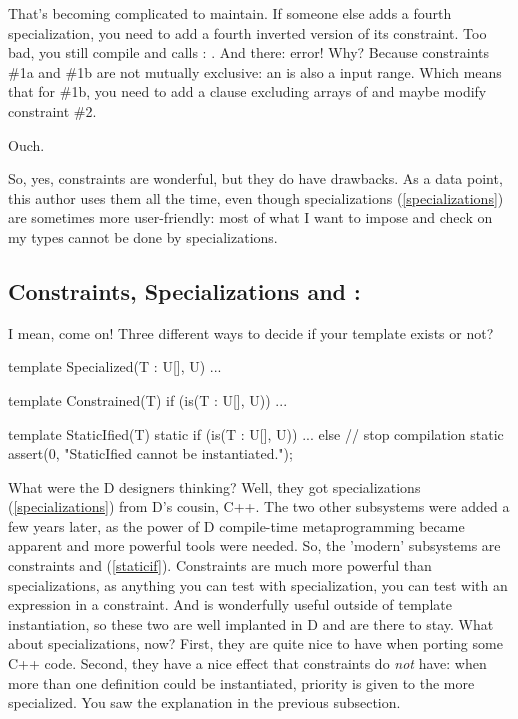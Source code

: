 That's becoming complicated to maintain. If someone else adds a fourth specialization, you need to add a fourth inverted version of its constraint. Too bad, you still compile and calls : \DD{[])}. And there: error! Why? Because constraints \#1a and \#1b are not mutually exclusive: an \DD{[]} is also a input range. Which means that for \#1b, you need to add a clause excluding arrays of  and maybe modify constraint \#2.

Ouch. 

So, yes, constraints are wonderful, but they do have drawbacks. As a data point, this author uses them all the time, even though specializations (\ref{specializations}) are sometimes more user-friendly: most of what I want to impose and check on my types cannot be done by specializations. 

\subsection{Constraints, Specializations and :}
\label{constraintsorspecializations}

I mean, come on! Three different ways to decide if your template exists or not? 

\begin{dcode}
template Specialized(T : U[], U)
{ ... }

template Constrained(T) if (is(T : U[], U))
{ ... }

template StaticIfied(T)
{
    static if (is(T : U[], U))
    { ... }
    else // stop compilation
        static assert(0, "StaticIfied cannot be instantiated.");
}
\end{dcode}

What were the D designers thinking? Well, they got specializations (\ref{specializations}) from D's cousin, C++. The two other subsystems were added a few years later, as the power of D compile-time metaprogramming became apparent and more powerful tools were needed. So, the 'modern' subsystems are constraints and  (\ref{staticif}). Constraints are much more powerful than specializations, as anything you can test with specialization, you can test with an  expression in a constraint. And  is wonderfully useful outside of template instantiation, so these two are well implanted in D and are there to stay.
What about specializations, now? First, they are quite nice to have when porting some C++ code. Second, they have a nice effect that constraints do \emph{not} have: when more than one definition could be instantiated, priority is given to the more specialized. You saw the explanation in the previous subsection.

